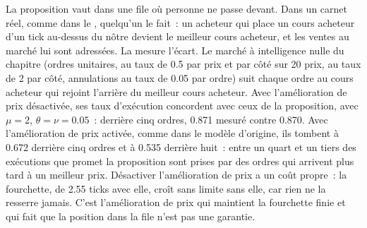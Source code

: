 \label{lst:mx:the-limit-order-book:fill}

La proposition vaut dans une file où personne ne passe devant. Dans un carnet réel, comme dans le , quelqu'un le fait~: un acheteur qui place
un cours acheteur d'un tick au-dessus du nôtre devient le meilleur cours acheteur, et les ventes au marché lui sont adressées. La  mesure l'écart. Le
marché à intelligence nulle du chapitre (ordres unitaires,  au taux de 0.5 par prix et par côté sur 20 prix,  au taux de 2 par côté, annulations au taux de
0.05 par ordre) suit chaque ordre au cours acheteur qui rejoint l'arrière du meilleur cours acheteur. Avec l'amélioration de prix désactivée, ses taux d'exécution concordent avec ceux de la proposition, avec
$\mu=2$, $\theta=\nu=0.05$~: derrière cinq ordres, 0.871 mesuré contre 0.870. Avec l'amélioration de prix activée, comme dans le modèle d'origine, ils tombent à 0.672 derrière
cinq ordres et à 0.535 derrière huit~: entre un quart et un tiers des exécutions que promet la proposition sont prises par des ordres qui arrivent
plus tard à un meilleur prix. Désactiver
l'amélioration de prix a un coût propre~: la fourchette, de 2.55 ticks avec elle, croît sans limite sans elle, car rien ne la resserre jamais.
C'est l'amélioration de prix qui maintient la fourchette finie et qui fait que la position dans la file n'est pas une garantie.

